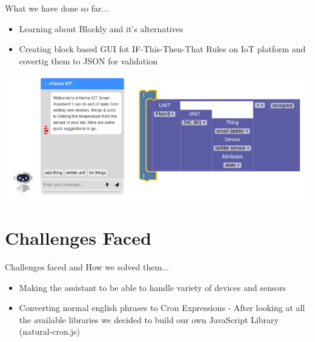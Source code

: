 \documentclass[10pt, a4paper]{beamer}
\begin{document}
\begin{frame}{What we have done so far...}
	\begin{itemize}
		\item Learning about Blockly and it's alternatives
		\item Creating block based GUI fot IF-This-Then-That Rules on IoT platform and covertig them to JSON for validation
		\newline\\\vspace{0.3cm}				
	\end{itemize}
	\includegraphics[totalheight=4cm]{all.png}
	\vspace{0.3cm}
\end{frame}

\section{Challenges Faced}
\begin{frame}{Challenges faced and How we solved them...}
	\begin{itemize}
		\item Making the assistant to be able to handle variety of devices and sensors
		\newline
		\item Converting normal english phrases to Cron Expressions
		\newline
		\hspace{4cm} - After looking at all the available libraries we decided to build our own JavaScript Library (natural-cron.js)
	\end{itemize}
\end{frame}
\end{document}
